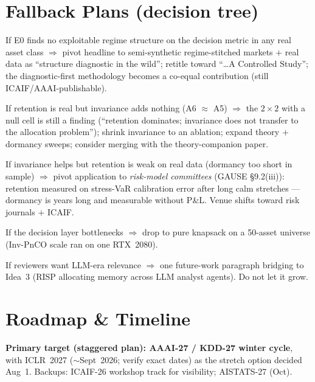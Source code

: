 \documentclass[11pt]{article}
\newcommand{\risp}{\textsc{RISP}}
\begin{document}
\section{Fallback Plans (decision tree)}
\begin{description}[leftmargin=1.6em]
  \item[F1] If E0 finds no exploitable regime structure on the decision metric in any real asset class $\Rightarrow$ pivot headline to semi-synthetic regime-stitched markets $+$ real data as ``structure diagnostic in the wild''; retitle toward ``\dots A Controlled Study''; the diagnostic-first methodology becomes a co-equal contribution (still ICAIF/AAAI-publishable).
  \item[F2] If retention is real but invariance adds nothing (A6 $\approx$ A5) $\Rightarrow$ the $2\times2$ with a null cell is still a finding (``retention dominates; invariance does not transfer to the allocation problem''); shrink invariance to an ablation; expand theory $+$ dormancy sweeps; consider merging with the theory-companion paper.
  \item[F3] If invariance helps but retention is weak on real data (dormancy too short in sample) $\Rightarrow$ pivot application to \emph{risk-model committees} (GAUSE \S9.2(iii)): retention measured on stress-VaR calibration error after long calm stretches --- dormancy is years long and measurable without P\&L. Venue shifts toward risk journals $+$ ICAIF.
  \item[F4] If the decision layer bottlenecks $\Rightarrow$ drop to pure knapsack on a 50-asset universe (Inv-PnCO scale ran on one RTX~2080).
  \item[F5] If reviewers want LLM-era relevance $\Rightarrow$ one future-work paragraph bridging to Idea~3 (\risp{} allocating memory across LLM analyst agents). Do not let it grow.
\end{description}

\section{Roadmap \& Timeline}
\textbf{Primary target (staggered plan): AAAI-27 / KDD-27 winter cycle}, with ICLR~2027 ($\sim$Sept~2026; verify exact dates) as the stretch option decided Aug~1. Backups: ICAIF-26 workshop track for visibility; AISTATS-27 (Oct).
\end{document}
